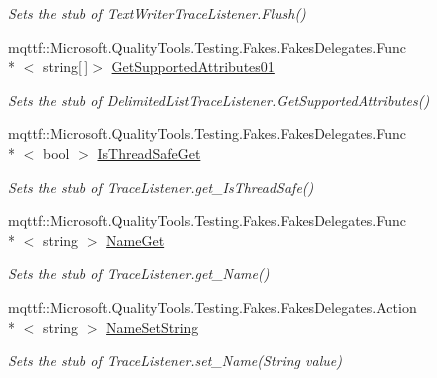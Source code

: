 \begin{DoxyCompactItemize}
\begin{DoxyCompactList}\small\item\em Sets the stub of Text\-Writer\-Trace\-Listener.\-Flush()\end{DoxyCompactList}\item 
mqttf\-::\-Microsoft.\-Quality\-Tools.\-Testing.\-Fakes.\-Fakes\-Delegates.\-Func\\*
$<$ string\mbox{[}$\,$\mbox{]}$>$ \hyperlink{class_system_1_1_diagnostics_1_1_fakes_1_1_stub_delimited_list_trace_listener_a294fd3d3c64c5c344f17861ba23c72fa}{Get\-Supported\-Attributes01}
\begin{DoxyCompactList}\small\item\em Sets the stub of Delimited\-List\-Trace\-Listener.\-Get\-Supported\-Attributes()\end{DoxyCompactList}\item 
mqttf\-::\-Microsoft.\-Quality\-Tools.\-Testing.\-Fakes.\-Fakes\-Delegates.\-Func\\*
$<$ bool $>$ \hyperlink{class_system_1_1_diagnostics_1_1_fakes_1_1_stub_delimited_list_trace_listener_a3230302952a50d25ad9b228f656fb81c}{Is\-Thread\-Safe\-Get}
\begin{DoxyCompactList}\small\item\em Sets the stub of Trace\-Listener.\-get\-\_\-\-Is\-Thread\-Safe()\end{DoxyCompactList}\item 
mqttf\-::\-Microsoft.\-Quality\-Tools.\-Testing.\-Fakes.\-Fakes\-Delegates.\-Func\\*
$<$ string $>$ \hyperlink{class_system_1_1_diagnostics_1_1_fakes_1_1_stub_delimited_list_trace_listener_aee9f67064ec105a4d5b55c1b84b11ffc}{Name\-Get}
\begin{DoxyCompactList}\small\item\em Sets the stub of Trace\-Listener.\-get\-\_\-\-Name()\end{DoxyCompactList}\item 
mqttf\-::\-Microsoft.\-Quality\-Tools.\-Testing.\-Fakes.\-Fakes\-Delegates.\-Action\\*
$<$ string $>$ \hyperlink{class_system_1_1_diagnostics_1_1_fakes_1_1_stub_delimited_list_trace_listener_ade9e7c28b08020afd5024a4483b86a91}{Name\-Set\-String}
\begin{DoxyCompactList}\small\item\em Sets the stub of Trace\-Listener.\-set\-\_\-\-Name(\-String value)\end{DoxyCompactList}\item 

\end{DoxyCompactItemize}
